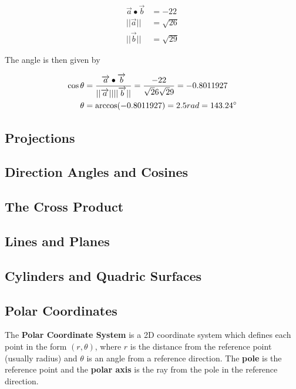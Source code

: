 \documentclass{article}
\begin{document}
            \begin{align*}
                \overrightarrow{a}\bullet\overrightarrow{b} &= -22\\
                ||\overrightarrow{a}|| &= \sqrt{26}\\
                ||\overrightarrow{b}|| &= \sqrt{29}
            \end{align*}

            \noindent The angle is then given by

            \begin{align*}
                \cos{\theta} &= \frac{\overrightarrow{a}\bullet\overrightarrow{b}}{||\overrightarrow{a}||||\overrightarrow{b}||}=\frac{-22}{\sqrt26\sqrt29}=-0.8011927\\
                \theta &= \arccos(-0.8011927)=2.5 rad = 143.24\degree
            \end{align*}

        \pagebreak
        \subsection{Projections}
        \subsection{Direction Angles and Cosines}
        \subsection{The Cross Product}
        \subsection{Lines and Planes}
        \subsection{Cylinders and Quadric Surfaces}
        \pagebreak

        \subsection{Polar Coordinates}
            The \textbf{Polar Coordinate System} is a 2D coordinate system which defines each point
            in the form $(r,\theta)$, where $r$ is the distance from the reference point
            (usually radius) and $\theta$ is an angle from a reference direction. The
            \textbf{pole} is the reference point and the \textbf{polar axis} is the ray from the
            pole in the reference direction. \\
\end{document}
